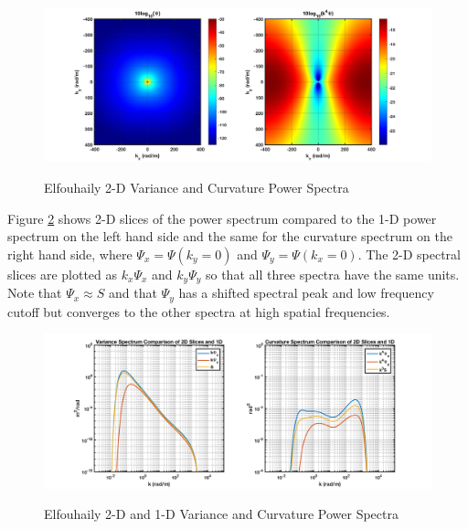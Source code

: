 \begin{figure}[H]
  \begin{center}
\includegraphics[width=6.5in]{../media/Ocean_Surface/elf_variance_curvature_spectrum_2D.png}
  \end{center}
  \renewcommand{\baselinestretch}{1} \small\normalsize
  \begin{quote}
    \caption[Elfouhaily 2-D Variance and Curvature Power Spectra]{Elfouhaily 2-D Variance and Curvature Power Spectra\label{os_fig:7bb}}
  \end{quote}
\end{figure}
\renewcommand{\baselinestretch}{2} \small\normalsize

Figure \ref{os_fig:7bc} shows 2-D slices of the power spectrum compared to the 1-D power spectrum on the left hand side and the same for the curvature spectrum on the right hand side, where $\Psi_x = \Psi(k_y = 0)$ and $\Psi_y = \Psi(k_x = 0)$. The 2-D spectral slices are plotted as $k_x\Psi_x$ and $k_y\Psi_y$ so that all three spectra have the same units. Note that $\Psi_x \approx S$ and that $\Psi_y$ has a shifted spectral peak and low frequency cutoff but converges to the other spectra at high spatial frequencies.

\begin{figure}[H]
  \begin{center}
\includegraphics[width=6in]{../media/Ocean_Surface/elf_variance_curvature_spectrum_2D_slices.png}
  \end{center}
  \renewcommand{\baselinestretch}{1} \small\normalsize
  \begin{quote}
    \caption[Elfouhaily 2-D and 1D Variance and Curvature Power Spectra]{Elfouhaily 2-D and 1-D Variance and Curvature Power Spectra\label{os_fig:7bc}}
  \end{quote}
\end{figure}
\renewcommand{\baselinestretch}{2} \small\normalsize

